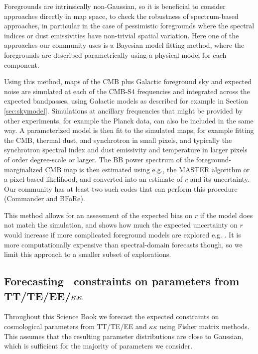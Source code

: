Foregrounds are intrinsically non-Gaussian, so it is beneficial to consider approaches directly in map space, to check the robustness of spectrum-based approaches, in particular in the case of pessimistic foregrounds where the spectral indices or dust emissivities have non-trivial spatial variation. Here one of the approaches our community uses is a Bayesian model fitting method, where the foregrounds are described parametrically using a physical model for each component.

Using this method, maps of the CMB plus Galactic foreground sky and expected noise are simulated at each of the CMB-S4 frequencies and integrated across the expected bandpasses, using Galactic models as described for example in Section \ref{sec:skymodel}. Simulations at ancillary frequencies that might be provided by other experiments, for example the Planck data, can also be included in the same way. A parameterized model is then fit to the simulated maps, for example fitting the CMB, thermal dust, and synchrotron in small pixels, and typically the synchrotron spectral index and dust emissivity and temperature in larger pixels of order degree-scale or larger. The BB power spectrum of the foreground-marginalized CMB map is then estimated using e.g., the MASTER \cite{hivon02} algorithm or a pixel-based likelihood, and converted into an estimate of $r$ and its uncertainty. Our community has at least two such codes that can perform this procedure (Commander and BFoRe).

This method allows for an assessment of the expected bias on $r$ if the model does not match the simulation, and shows how much the expected uncertainty on $r$ would increase if more complicated foreground models are explored e.g. \cite{armitage-caplan12,remazeilles16}. It is more computationally expensive than spectral-domain forecasts though, so we limit this approach to a smaller subset of explorations. 

\subsection{Forecasting \cmbexp\ constraints on parameters from TT/TE/EE/$\kappa\kappa$}

Throughout this Science Book we forecast the expected constraints on cosmological parameters from TT/TE/EE and $\kappa\kappa$ using Fisher matrix methods. This assumes that the resulting parameter distributions are close to Gaussian, which is sufficient for the majority of parameters we consider.

